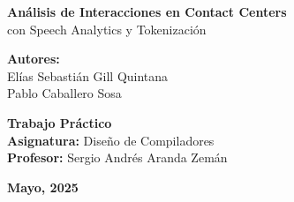 \begin{center}


	\vspace*{2cm} %
	{\LARGE \textbf{Análisis de Interacciones en Contact Centers} \\
		\vspace{0.3cm} %
		\large con Speech Analytics y Tokenización \\}
	\vspace{1.5cm} %

	\begin{minipage}{0.8\textwidth}
		\centering
		\large
		\textbf{Autores:} \\
		\vspace{0.5cm} %
		Elías Sebastián Gill Quintana \\
		\vspace{0.2cm} %
		Pablo Caballero Sosa \\ %
	\end{minipage}
	\vfill

	\large
	\textbf{Trabajo Práctico} \\
	\vspace{0.3cm}
	\textbf{Asignatura:} Diseño de Compiladores \\
	\vspace{0.3cm}
	\textbf{Profesor:} Sergio Andrés Aranda Zemán \\
	\vspace{1cm}

	\textbf{Mayo, 2025}
	\vspace*{1cm} %

\end{center}

